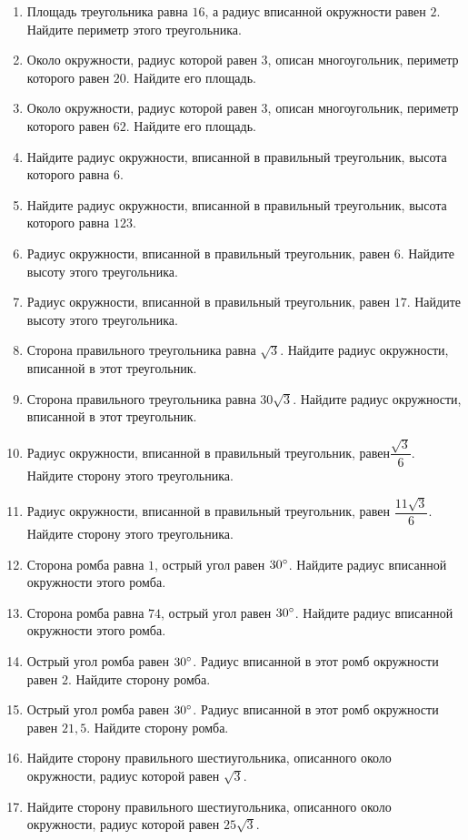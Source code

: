 \documentclass[12pt, a4paper]{article}
\begin{document}
\begin{enumerate}
		\item Площадь треугольника равна \( 16 \), а радиус вписанной окружности равен \( 2 \). Найдите периметр этого треугольника.
		\item Около окружности, радиус которой равен \( 3 \), описан многоугольник, периметр которого равен \( 20 \). Найдите его площадь.
		\item Около окружности, радиус которой равен \( 3 \), описан многоугольник, периметр которого равен \( 62 \). Найдите его площадь.
		\item Найдите радиус окружности, вписанной в правильный треугольник, высота которого равна \( 6 \).
		\item Найдите радиус окружности, вписанной в правильный треугольник, высота которого равна \( 123 \).
		\item Радиус окружности, вписанной в правильный треугольник, равен \( 6 \). Найдите высоту этого треугольника.
		\item Радиус окружности, вписанной в правильный треугольник, равен \( 17 \). Найдите высоту этого треугольника.
		\item Сторона правильного треугольника равна \( \sqrt{3} \). Найдите радиус окружности, вписанной в этот треугольник.
		\item Сторона правильного треугольника равна \( 30\sqrt{3} \). Найдите радиус окружности, вписанной в этот треугольник.
		\item Радиус окружности, вписанной в правильный треугольник, равен\( \dfrac{\sqrt{3}}{6} \).  Найдите сторону этого треугольника.
		\item Радиус окружности, вписанной в правильный треугольник, равен  \( \dfrac{11\sqrt{3}}{6} \).  Найдите сторону этого треугольника.
		\item Сторона ромба равна \( 1 \), острый угол равен \( 30 \degree\). Найдите радиус вписанной окружности этого ромба.
		\item Сторона ромба равна \( 74 \), острый угол равен \( 30 \degree \). Найдите радиус вписанной окружности этого ромба.
		\item Острый угол ромба равен \( 30 \degree\). Радиус вписанной в этот ромб окружности равен \( 2 \). Найдите сторону ромба.
		\item Острый угол ромба равен \( 30 \degree\). Радиус вписанной в этот ромб окружности равен \( 21,5 \). Найдите сторону ромба.
		\item Найдите сторону правильного шестиугольника, описанного около окружности, радиус которой равен \( \sqrt{3} \).
		\item Найдите сторону правильного шестиугольника, описанного около окружности, радиус которой равен \( 25\sqrt{3} \).

\end{enumerate}
\end{document}
